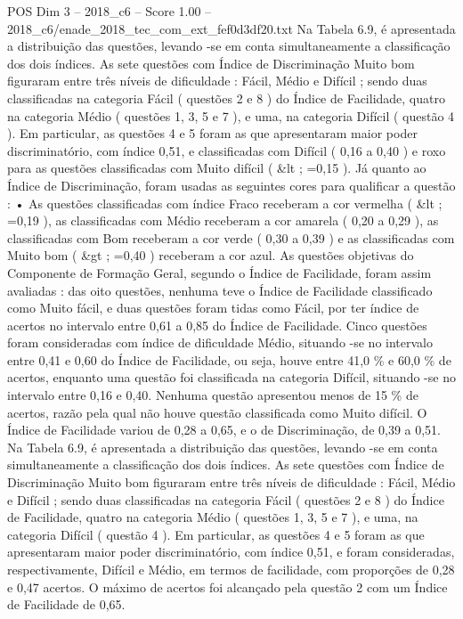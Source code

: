 \begin{textsample}{POS Dim 3 – 2018\_c6 – Score 1.00 – 2018\_c6/enade\_2018\_tec\_com\_ext\_fef0d3df20.txt}
Na Tabela 6.9, é apresentada a distribuição das questões, levando -se em conta simultaneamente a classificação dos dois índices.
As sete questões com Índice de Discriminação Muito bom figuraram entre três níveis de dificuldade : Fácil, Médio e Difícil ; sendo duas classificadas na categoria Fácil ( questões 2 e 8 ) do Índice de Facilidade, quatro na categoria Médio ( questões 1, 3, 5 e 7 ), e uma, na categoria Difícil ( questão 4 ).
Em particular, as questões 4 e 5 foram as que apresentaram maior poder discriminatório, com índice 0,51, e classificadas com Difícil ( 0,16 a 0,40 ) e roxo para as questões classificadas com Muito difícil ( \&lt ; =0,15 ).
Já quanto ao Índice de Discriminação, foram usadas as seguintes cores para qualificar a questão : • As questões classificadas com índice Fraco receberam a cor vermelha ( \&lt ; =0,19 ), as classificadas com Médio receberam a cor amarela ( 0,20 a 0,29 ), as classificadas com Bom receberam a cor verde ( 0,30 a 0,39 ) e as classificadas com Muito bom ( \&gt ; =0,40 ) receberam a cor azul.
As questões objetivas do Componente de Formação Geral, segundo o Índice de Facilidade, foram assim avaliadas : das oito questões, nenhuma teve o Índice de Facilidade classificado como Muito fácil, e duas questões foram tidas como Fácil, por ter índice de acertos no intervalo entre 0,61 a 0,85 do Índice de Facilidade.
Cinco questões foram consideradas com índice de dificuldade Médio, situando -se no intervalo entre 0,41 e 0,60 do Índice de Facilidade, ou seja, houve entre 41,0 \% e 60,0 \% de acertos, enquanto uma questão foi classificada na categoria Difícil, situando -se no intervalo entre 0,16 e 0,40.
Nenhuma questão apresentou menos de 15 \% de acertos, razão pela qual não houve questão classificada como Muito difícil.
O Índice de Facilidade variou de 0,28 a 0,65, e o de Discriminação, de 0,39 a 0,51.
Na Tabela 6.9, é apresentada a distribuição das questões, levando -se em conta simultaneamente a classificação dos dois índices.
As sete questões com Índice de Discriminação Muito bom figuraram entre três níveis de dificuldade : Fácil, Médio e Difícil ; sendo duas classificadas na categoria Fácil ( questões 2 e 8 ) do Índice de Facilidade, quatro na categoria Médio ( questões 1, 3, 5 e 7 ), e uma, na categoria Difícil ( questão 4 ).
Em particular, as questões 4 e 5 foram as que apresentaram maior poder discriminatório, com índice 0,51, e foram consideradas, respectivamente, Difícil e Médio, em termos de facilidade, com proporções de 0,28 e 0,47 acertos.
O máximo de acertos foi alcançado pela questão 2 com um Índice de Facilidade de 0,65.

\end{textsample}
